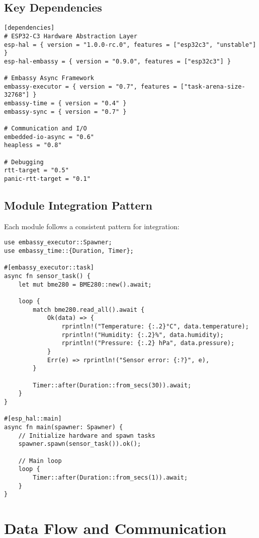 \documentclass[12pt,a4paper]{article}
\begin{document}
\subsection{Key Dependencies}

\begin{lstlisting}[caption={Core Dependencies (Cargo.toml)}]
[dependencies]
# ESP32-C3 Hardware Abstraction Layer
esp-hal = { version = "1.0.0-rc.0", features = ["esp32c3", "unstable"] }
esp-hal-embassy = { version = "0.9.0", features = ["esp32c3"] }

# Embassy Async Framework
embassy-executor = { version = "0.7", features = ["task-arena-size-32768"] }
embassy-time = { version = "0.4" }
embassy-sync = { version = "0.7" }

# Communication and I/O
embedded-io-async = "0.6"
heapless = "0.8"

# Debugging
rtt-target = "0.5"
panic-rtt-target = "0.1"
\end{lstlisting}

\subsection{Module Integration Pattern}

Each module follows a consistent pattern for integration:

\begin{lstlisting}[caption={Module Integration Example}]
use embassy_executor::Spawner;
use embassy_time::{Duration, Timer};

#[embassy_executor::task]
async fn sensor_task() {
    let mut bme280 = BME280::new().await;
    
    loop {
        match bme280.read_all().await {
            Ok(data) => {
                rprintln!("Temperature: {:.2}°C", data.temperature);
                rprintln!("Humidity: {:.2}%", data.humidity);
                rprintln!("Pressure: {:.2} hPa", data.pressure);
            }
            Err(e) => rprintln!("Sensor error: {:?}", e),
        }
        
        Timer::after(Duration::from_secs(30)).await;
    }
}

#[esp_hal::main]
async fn main(spawner: Spawner) {
    // Initialize hardware and spawn tasks
    spawner.spawn(sensor_task()).ok();
    
    // Main loop
    loop {
        Timer::after(Duration::from_secs(1)).await;
    }
}
\end{lstlisting}

\section{Data Flow and Communication}
\end{document}
